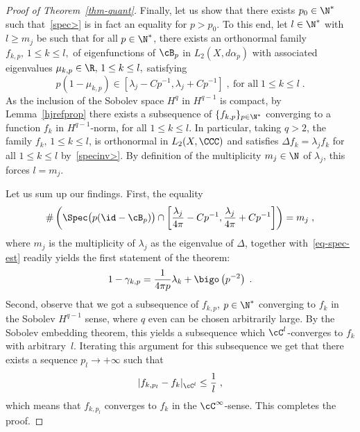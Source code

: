 \begin{proof}[Proof of Theorem~\ref{thm-quant}]
Finally, let us show that there exists $p_0\in\N^*$ such that~\eqref{spec>} is in fact an equality for $p>p_0$. To this end, let $l\in\N^*$ with $l\geq m_j$ be such that for all $p\in\N^*$, there exists an orthonormal family $f_{k,p},\,1\leq k\leq l,$ of eigenfunctions of $\cB_p$ in $L_2(X,d\alpha_p)$ with associated eigenvalues $\mu_{k,p}\in\R,\,1\leq k\leq l,$ satisfying
\begin{equation}
p(1-\mu_{k,p})\in\left[\lambda_j-Cp^{-1},\lambda_j+Cp^{-1}\right]\;,\:
\text{for all}\;1\leq k\leq l\;.
\end{equation}
As the inclusion of the Sobolev space $H^q$ in $H^{q-1}$ is compact, by Lemma~\ref{hjrefprop} there exists a subsequence of $\{f_{k,p}\}_{p\in\N^*}$ converging to a function $f_k$ in $H^{q-1}$-norm, for all $1\leq k\leq l$. In particular, taking $q>2$, the family $f_k,\,1\leq k\leq l$, is orthonormal in $L_2(X,\CCC)$ and satisfies $\Delta f_k=\lambda_j f_k$ for all $1\leq k\leq l$ by~\eqref{specinv>}. By definition of the multiplicity $m_j\in\N$ of $\lambda_j$, this forces $l=m_j$.

Let us sum up our findings. First, the equality
\[
\#\left(\Spec\big(p(\id-\cB_p)\big)\cap\left[\frac{\lambda_j}{4\pi}-Cp^{-1},\frac{\lambda_j}{4\pi}+Cp^{-1}\right]\right) = m_j\;,
\]
where $m_j$ is the multiplicity of $\lambda_j$ as the eigenvalue of $\Delta$, together with~\eqref{eq-spec-est} readily yields the first statement of the theorem:
\[
1-\gamma_{k,p} =\frac{1}{4\pi p}\lambda_k + \bigo\left(p^{-2}\right)\;.
\]
Second, observe that we got a subsequence of $f_{k,p}$, $p \in \N^*$ converging to $f_k$ in the Sobolev $H^{q-1}$ sense, where $q$ even can be chosen arbitrarily large. By the Sobolev embedding theorem, this yields a subsequence which $\cC^l$-converges to $f_k$ with arbitrary~$l$. Iterating this argument for this subsequence we get that there exists a sequence $p_l \to +\infty$ such that
\[
|f_{k,p_l} - f_k|_{\cC^l} \leq \frac{1}{l}\;,
\]
which means that $f_{k,p_l}$ converges to $f_k$ in the $\cC^\infty$-sense. This completes the proof.
\end{proof}
%
